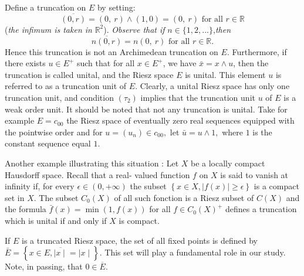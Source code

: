 \documentclass{birkau}
\numberwithin{equation}{section}
\theoremstyle{plain}
\theoremstyle{definition}
\begin{document}
Define a truncat\'{\i}on on $E$ by setting:%
\[
\overline{(0,r)}=(0,\ r)\wedge(1,0)=(0,\ r)\text{ for all }r\in\mathbb{R}%
\]
(\textit{the infimum is taken in} $\mathbb{R}^{2}$). \textit{Observe that if}
$n\in\{1,2,...\}$,\textit{then }%
\[
\overline{n(0,r)}=n(0,\ r)\text{ for all }r\in\mathbb{R}.
\]
Hence this truncation is not an Archimedean truncation on $E.$
Furthermore, if there exists $u\in E^{+}$ such that for all $x\in E^{+}$, we
have $\bar{x}=x\wedge u$, then the truncation is called unital, and the Riesz
space $E$ is unital. This element $u$ is referred to as a truncation unit of
$E$. Clearly, a unital Riesz space has only one truncation unit, and condition
$\left(  \tau_{2}\right)  $ implies that the truncation unit $u$ of $E$ is a
weak order unit. It should be noted that not any truncation is unital. Take for example $E=c_{00}$ the Riesz space of eventually zero real sequences
equipped with the pointwise order and for $u=\left(  u_{n}\right)  \in
c_{00},$ let $\bar{u}=u\wedge1,$ where $1$ is the constant sequence equal $1$.

Another example illustrating this situation : Let $X$ be a locally compact
Hausdorff space. Recall that a real- valued function $f$ on $X$ is said to
vanish at infinity if, for every $\epsilon\in\left(  0,+\infty\right)  $ the
subset $\left\{  x\in X,\left\vert f\left(  x\right)  \right\vert \geq
\epsilon\right\}  $ is a compact set in $X.$ The subset $C_{0}\left(
X\right)  $ of all such fonction is a Riesz subset of $C\left(  X\right)  $
and the formula $\bar{f}\left(  x\right)  =\min\left(  1,f\left(  x\right)
\right)  $ for all $f\in C_{0}\left(  X\right)  ^{+}$ defines a truncation
which is unital if and only if $X$ is compact.

If $E$ is a truncated Riesz space, the set of all fixed points is defined by
$\bar{E}=\left\{ x\in E,\overline{\mid x\mid }=\mid x\mid \right\} $. This set will play a
fundamental role in our study.  Note,  in passing,  that $0\in\overline{E}$. 
\end{document}
